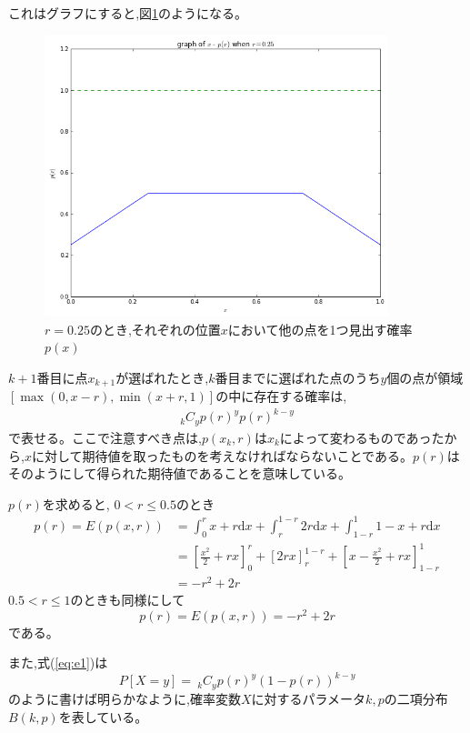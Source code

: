 これはグラフにすると,図\ref{fig:f3}のようになる。
\begin{figure}[H]
    \begin{center}
        \includegraphics[width=10cm]{../img/fig3.png}
        \caption{$r=0.25$のとき,それぞれの位置$x$において他の点を1つ見出す確率$p(x)$}
        \label{fig:f3}
    \end{center}
\end{figure}

$k+1$番目に点$x_{k+1}$が選ばれたとき,$k$番目までに選ばれた点のうち$y$個の点が領域$[\max(0,x-r), \min(x+r,1)]$の中に存在する確率は,
\begin{eqnarray}
_{k}C_{y}p(r)^{y}p(r)^{k-y}
\label{eq:e1}
\end{eqnarray}
で表せる。ここで注意すべき点は,$p(x_{k}, r)$は$x_{k}$によって変わるものであったから,$x$に対して期待値を取ったものを考えなければならないことである。$p(r)$はそのようにして得られた期待値であることを意味している。

$p(r)$を求めると,
$0<r\le0.5$のとき
\begin{align}p(r) = E(p(x, r)) &= \int^{r}_{0}x+r\mathrm{d}x + \int^{1-r}_{r}2r \mathrm{d}x + \int^{1}_{1-r} 1-x+r \mathrm{d}x\nonumber \\
&= \left[\frac{x^{2}}{2} + rx \right]^{r}_{0} + \left[ 2rx\right]^{1-r}_{r}+ \left[ x-\frac{x^{2}}{2} + rx\right]^{1}_{1-r}\nonumber \\
&= -r^{2} + 2r \end{align}
$0.5<r\le1$のときも同様にして
\[p(r) = E(p(x,r)) = -r^{2} + 2r\]
である。

また,式(\ref{eq:e1})は
\[P[X=y] =\ _{k}C_{y}p(r)^{y}(1-p(r))^{k-y}\]
のように書けば明らかなように,確率変数$X$に対するパラメータ$k,p$の二項分布$B(k,p)$を表している。

